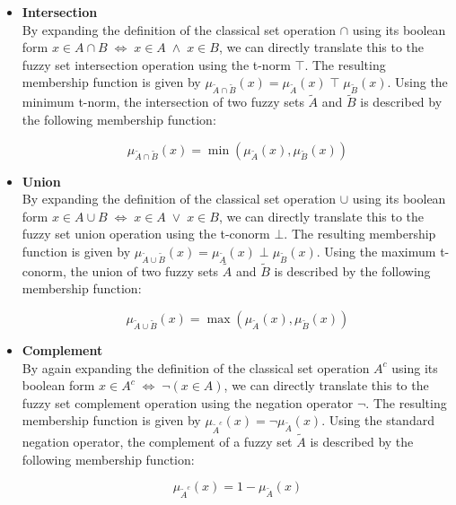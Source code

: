 \begin{itemize}

      \item \textbf{Intersection} \\
            By expanding the definition of the classical set operation $\cap$ using its boolean form $x \in A \cap B \; \iff \; x \in A \; \land \; x \in B$, we can directly translate this to the fuzzy set intersection operation using the t-norm $\top$. The resulting membership function is given by $\mu_{\tilde{A} \cap \tilde{B}}(x) = \mu_{\tilde{A}}(x) \; \top \; \mu_{\tilde{B}}(x)$. Using the minimum t-norm, the intersection of two fuzzy sets $\tilde{A}$ and $\tilde{B}$ is described by the following membership function:

            \begin{equation*}
                  \mu_{\tilde{A} \cap \tilde{B}}(x) = \min(\mu_{\tilde{A}}(x), \mu_{\tilde{B}}(x))
            \end{equation*}


      \item \textbf{Union} \\
            By expanding the definition of the classical set operation $\cup$ using its boolean form $x \in A \cup B \; \iff \; x \in A \; \lor \; x \in B$, we can directly translate this to the fuzzy set union operation using the t-conorm $\bot$. The resulting membership function is given by $\mu_{\tilde{A} \cup \tilde{B}}(x) = \mu_{\tilde{A}}(x) \;\bot \; \mu_{\tilde{B}}(x)$. Using the maximum t-conorm, the union of two fuzzy sets $\tilde{A}$ and $\tilde{B}$ is described by the following membership function:

            \begin{equation*}
                  \mu_{\tilde{A} \cup \tilde{B}}(x) = \max(\mu_{\tilde{A}}(x), \mu_{\tilde{B}}(x))
            \end{equation*}

      \item \textbf{Complement} \\
            By again expanding the definition of the classical set operation $A^c$ using its boolean form $x \in A^c \; \iff \; \neg (x \in A)$, we can directly translate this to the fuzzy set complement operation using the negation operator $\neg$. The resulting membership function is given by $\mu_{ \tilde{A}^c}(x) = \neg \mu_{\tilde{A}}(x)$. Using the standard negation operator, the complement of a fuzzy set $\tilde{A}$ is described by the following membership function:

            \begin{equation*}
                  \mu_{ \tilde{A}^c}(x) = 1 - \mu_{\tilde{A}}(x)
            \end{equation*}
\end{itemize}


